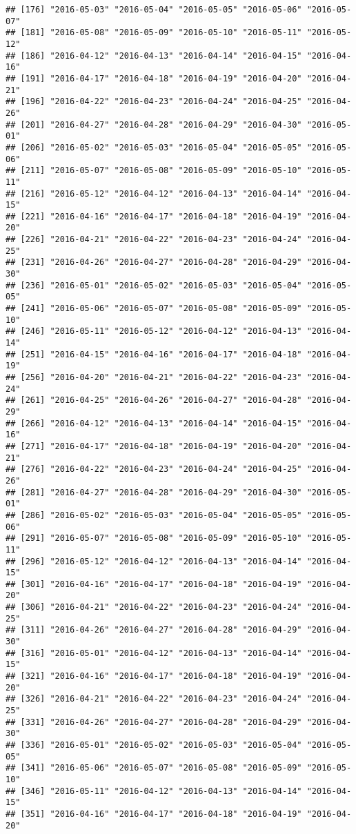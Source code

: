 \documentclass[
]{article}
\begin{document}
\begin{verbatim}
## [176] "2016-05-03" "2016-05-04" "2016-05-05" "2016-05-06" "2016-05-07"
## [181] "2016-05-08" "2016-05-09" "2016-05-10" "2016-05-11" "2016-05-12"
## [186] "2016-04-12" "2016-04-13" "2016-04-14" "2016-04-15" "2016-04-16"
## [191] "2016-04-17" "2016-04-18" "2016-04-19" "2016-04-20" "2016-04-21"
## [196] "2016-04-22" "2016-04-23" "2016-04-24" "2016-04-25" "2016-04-26"
## [201] "2016-04-27" "2016-04-28" "2016-04-29" "2016-04-30" "2016-05-01"
## [206] "2016-05-02" "2016-05-03" "2016-05-04" "2016-05-05" "2016-05-06"
## [211] "2016-05-07" "2016-05-08" "2016-05-09" "2016-05-10" "2016-05-11"
## [216] "2016-05-12" "2016-04-12" "2016-04-13" "2016-04-14" "2016-04-15"
## [221] "2016-04-16" "2016-04-17" "2016-04-18" "2016-04-19" "2016-04-20"
## [226] "2016-04-21" "2016-04-22" "2016-04-23" "2016-04-24" "2016-04-25"
## [231] "2016-04-26" "2016-04-27" "2016-04-28" "2016-04-29" "2016-04-30"
## [236] "2016-05-01" "2016-05-02" "2016-05-03" "2016-05-04" "2016-05-05"
## [241] "2016-05-06" "2016-05-07" "2016-05-08" "2016-05-09" "2016-05-10"
## [246] "2016-05-11" "2016-05-12" "2016-04-12" "2016-04-13" "2016-04-14"
## [251] "2016-04-15" "2016-04-16" "2016-04-17" "2016-04-18" "2016-04-19"
## [256] "2016-04-20" "2016-04-21" "2016-04-22" "2016-04-23" "2016-04-24"
## [261] "2016-04-25" "2016-04-26" "2016-04-27" "2016-04-28" "2016-04-29"
## [266] "2016-04-12" "2016-04-13" "2016-04-14" "2016-04-15" "2016-04-16"
## [271] "2016-04-17" "2016-04-18" "2016-04-19" "2016-04-20" "2016-04-21"
## [276] "2016-04-22" "2016-04-23" "2016-04-24" "2016-04-25" "2016-04-26"
## [281] "2016-04-27" "2016-04-28" "2016-04-29" "2016-04-30" "2016-05-01"
## [286] "2016-05-02" "2016-05-03" "2016-05-04" "2016-05-05" "2016-05-06"
## [291] "2016-05-07" "2016-05-08" "2016-05-09" "2016-05-10" "2016-05-11"
## [296] "2016-05-12" "2016-04-12" "2016-04-13" "2016-04-14" "2016-04-15"
## [301] "2016-04-16" "2016-04-17" "2016-04-18" "2016-04-19" "2016-04-20"
## [306] "2016-04-21" "2016-04-22" "2016-04-23" "2016-04-24" "2016-04-25"
## [311] "2016-04-26" "2016-04-27" "2016-04-28" "2016-04-29" "2016-04-30"
## [316] "2016-05-01" "2016-04-12" "2016-04-13" "2016-04-14" "2016-04-15"
## [321] "2016-04-16" "2016-04-17" "2016-04-18" "2016-04-19" "2016-04-20"
## [326] "2016-04-21" "2016-04-22" "2016-04-23" "2016-04-24" "2016-04-25"
## [331] "2016-04-26" "2016-04-27" "2016-04-28" "2016-04-29" "2016-04-30"
## [336] "2016-05-01" "2016-05-02" "2016-05-03" "2016-05-04" "2016-05-05"
## [341] "2016-05-06" "2016-05-07" "2016-05-08" "2016-05-09" "2016-05-10"
## [346] "2016-05-11" "2016-04-12" "2016-04-13" "2016-04-14" "2016-04-15"
## [351] "2016-04-16" "2016-04-17" "2016-04-18" "2016-04-19" "2016-04-20"

\end{verbatim}
\end{document}

